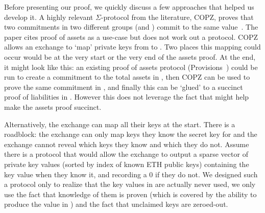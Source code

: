 Before presenting our \bootstrap proof, we quickly discuss a few approaches that helped us develop it. A highly relevant $\Sigma$-protocol from the literature, COPZ, proves that two commitments in two different groups (\eg \secp and \bls) commit to the same value~\cite{chase22}. The paper cites proof of assets as a use-case but does not work out a protocol. COPZ allows an exchange to `map' private keys from \secp to \bls. Two places this mapping could occur would be at the very start or the very end of the assets proof. At the end, it might look like this: an existing proof of assets protocol (\eg Provisions~\cite{provisions}) could be run to create a commitment to the total assets in \secp, then COPZ can be used to prove the same commitment in \bls, and finally this can be `glued' to a succinct proof of liabilities in \bls. However this does not leverage the fact that \bls might help make the assets proof succinct.

Alternatively, the exchange can map all their keys at the start. There is a roadblock: the exchange can only map keys they know the secret key for and the exchange cannot reveal which keys they know and which they do not. Assume there is a protocol that would allow the exchange to output a sparse vector of \bls private key values (sorted by index of known ETH public keys) containing the key value when they know it, and recording a 0 if they do not. We designed such a protocol only to realize that the key values in \bls are actually never used, we only use the fact that knowledge of them is proven (which is covered by the ability to produce the value in \bls) and the fact that unclaimed keys are zeroed-out. 

